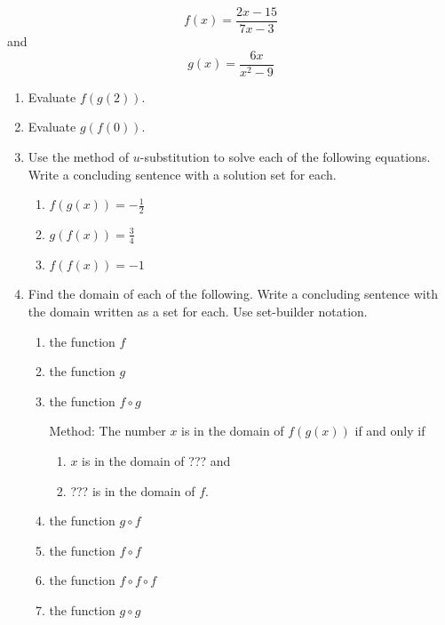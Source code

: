\documentclass{ximera}
\begin{document}
\begin{question} \label{DEf9ef93}

\[
    f(x) = \frac{2x-15}{7x-3}
\]
and 
\[
  g(x) = \frac{6x}{x^2-9}
\]

\begin{enumerate}
\item Evaluate $f(g(2))$.

\item Evaluate $g(f(0))$.

\item Use the method of $u$-substitution to solve each of the following equations. Write a concluding sentence with a solution set for each.

\begin{enumerate}
\item $f(g(x)) = -\frac{1}{2}$

\item $g(f(x))= \frac{3}{4}$

\item $f(f(x))=-1$
\end{enumerate}

\item Find the domain of each of the following. Write a concluding sentence with the domain written as a set for each. Use set-builder notation.

\begin{enumerate}
\item the function $f$

\item the function $g$

\item the function $f\circ g$

Method: The number $x$ is in the domain of $f(g(x))$ if and only if

\begin{enumerate}
\item $x$ is in the domain of ??? and

\item ??? is in the domain of $f$.
 
\end{enumerate}

\item the function $g\circ f$

\item the function $f\circ f$

\item the function $f\circ f \circ f$

\item the function $g\circ g$

\end{enumerate}
\end{enumerate}
\end{question}
\end{document}

